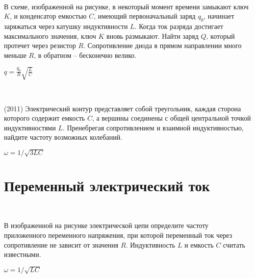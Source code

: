 \begin{ex}
\hspace{0pt} \\
\begin{minipage}{.65\textwidth}
В схеме, изображенной на рисунке, в некоторый момент времени замыкают ключ $K$, и конденсатор емкостью $C$, имеющий первоначальный заряд $q_0$, начинает заряжаться через катушку индуктивности $L$. 
Когда ток разряда достигает максимального значения, ключ $K$ вновь размыкают. Найти заряд $Q$, который протечет через резистор $R$. 
Сопротивление диода в прямом направлении много меньше $R$, в обратном -- бесконечно велико.
\end{minipage}
\begin{minipage}{.35\textwidth}
\centering

\end{minipage}
\begin{ans}
$q=\frac{q_0}{R}\sqrt{\frac{L}{C}}$
\end{ans}
\end{ex}

\begin{ex}
\hspace{0pt} \\
\begin{minipage}{.65\textwidth}
(2011) Электрический контур представляет собой треугольник, каждая сторона которого содержит емкость $C$, а вершины соединены с общей центральной точкой индуктивностями $L$. 
Пренебрегая сопротивлением и взаимной индуктивностью, найдите частоту возможных колебаний.
\end{minipage}
\begin{minipage}{.35\textwidth}
\centering

\end{minipage}
\begin{ans}
$\omega = 1/\sqrt{3LC}$
\end{ans}
\end{ex}

\section{Переменный электрический ток}

\begin{ex}
\hspace{0pt} \\
\begin{minipage}{.65\textwidth}
В изображенной на рисунке электрической цепи определите частоту приложенного переменного напряжения, при которой переменный ток через сопротивление не зависит от значения $R$. Индуктивность $L$ и емкость $C$ считать известными.
\end{minipage}
\begin{minipage}{.35\textwidth}
\centering

\end{minipage}
\begin{ans}
$\omega = 1/\sqrt{LC}$
\end{ans}
\end{ex}

